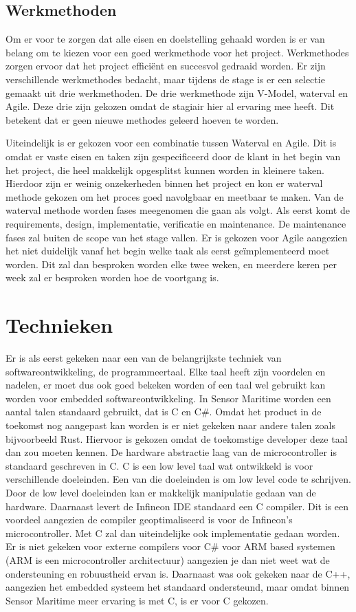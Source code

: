 \subsection{Werkmethoden}
Om er voor te zorgen dat alle eisen en doelstelling gehaald worden is er van belang om te kiezen voor een goed werkmethode voor het project. Werkmethodes zorgen ervoor dat het project efficiënt en succesvol gedraaid worden. Er zijn verschillende werkmethodes bedacht, maar tijdens de stage is er een selectie gemaakt uit drie werkmethoden. De drie werkmethode zijn V-Model, waterval en Agile. Deze drie zijn gekozen omdat de stagiair hier al ervaring mee heeft. Dit betekent dat er geen nieuwe methodes geleerd hoeven te worden. \newline

\noindent Uiteindelijk is er gekozen voor een combinatie tussen Waterval en Agile. Dit is omdat er vaste eisen en taken zijn gespecificeerd door de klant in het begin van het project, die heel makkelijk opgesplitst kunnen worden in kleinere taken. Hierdoor zijn er weinig onzekerheden binnen het project en kon er waterval methode gekozen om het proces goed navolgbaar en meetbaar te maken. Van de waterval methode worden fases meegenomen die gaan als volgt. Als eerst komt de requirements, design, implementatie, verificatie en maintenance. De maintenance fases zal buiten de scope van het stage vallen. Er is gekozen voor Agile aangezien het niet duidelijk vanaf het begin welke taak als eerst geïmplementeerd moet worden. Dit zal dan besproken worden elke twee weken, en meerdere keren per week zal er besproken worden hoe de voortgang is.




\section{Technieken}
Er is als eerst gekeken naar een van de belangrijkste techniek van softwareontwikkeling, de programmeertaal. Elke taal heeft zijn voordelen en nadelen, er moet dus ook goed bekeken worden of een taal wel gebruikt kan worden voor embedded softwareontwikkeling. In Sensor Maritime worden een aantal talen standaard gebruikt, dat is C en C\#. Omdat het product in de toekomst nog aangepast kan worden is er niet gekeken naar andere talen zoals bijvoorbeeld Rust. Hiervoor is gekozen omdat de toekomstige developer deze taal dan zou moeten kennen. De hardware abstractie laag van de microcontroller is standaard geschreven in C. C is een low level taal wat ontwikkeld is voor verschillende doeleinden. Een van die doeleinden is om low level code te schrijven. Door de low level doeleinden kan er makkelijk manipulatie gedaan van de hardware. Daarnaast levert de Infineon IDE standaard een C compiler. Dit is een voordeel aangezien de compiler geoptimaliseerd is voor de Infineon's microcontroller. Met C zal dan uiteindelijke ook implementatie gedaan worden. Er is niet gekeken voor externe compilers voor C\# voor ARM based systemen (ARM is een microcontroller architectuur) aangezien je dan niet weet wat de ondersteuning en robuustheid ervan is. Daarnaast was ook gekeken naar de C++, aangezien het embedded systeem het standaard ondersteund, maar omdat binnen Sensor Maritime meer ervaring is met C, is er voor C gekozen. 

